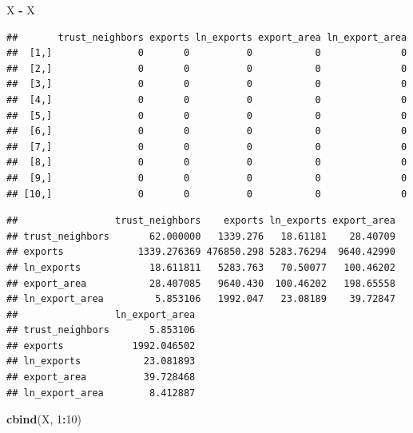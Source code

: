 \documentclass[]{book}
\newenvironment{Shaded}{\begin{snugshade}}{\end{snugshade}}
\newcommand{\KeywordTok}[1]{\textcolor[rgb]{0.13,0.29,0.53}{\textbf{#1}}}
\newcommand{\DecValTok}[1]{\textcolor[rgb]{0.00,0.00,0.81}{#1}}
\newcommand{\StringTok}[1]{\textcolor[rgb]{0.31,0.60,0.02}{#1}}
\newcommand{\OperatorTok}[1]{\textcolor[rgb]{0.81,0.36,0.00}{\textbf{#1}}}
\newcommand{\NormalTok}[1]{#1}
\theoremstyle{definition}
\theoremstyle{definition}
\theoremstyle{definition}
\theoremstyle{remark}
\begin{document}
\begin{Shaded}
\begin{Highlighting}[]
\NormalTok{X }\OperatorTok{-}\StringTok{ }\NormalTok{X}
\end{Highlighting}
\end{Shaded}

\begin{verbatim}
##       trust_neighbors exports ln_exports export_area ln_export_area
##  [1,]               0       0          0           0              0
##  [2,]               0       0          0           0              0
##  [3,]               0       0          0           0              0
##  [4,]               0       0          0           0              0
##  [5,]               0       0          0           0              0
##  [6,]               0       0          0           0              0
##  [7,]               0       0          0           0              0
##  [8,]               0       0          0           0              0
##  [9,]               0       0          0           0              0
## [10,]               0       0          0           0              0
\end{verbatim}

\begin{Shaded}
\end{Shaded}

\begin{verbatim}
##                 trust_neighbors    exports ln_exports export_area
## trust_neighbors       62.000000   1339.276   18.61181    28.40709
## exports             1339.276369 476850.298 5283.76294  9640.42990
## ln_exports            18.611811   5283.763   70.50077   100.46202
## export_area           28.407085   9640.430  100.46202   198.65558
## ln_export_area         5.853106   1992.047   23.08189    39.72847
##                 ln_export_area
## trust_neighbors       5.853106
## exports            1992.046502
## ln_exports           23.081893
## export_area          39.728468
## ln_export_area        8.412887
\end{verbatim}

\begin{Shaded}
\begin{Highlighting}[]
\KeywordTok{cbind}\NormalTok{(X, }\DecValTok{1}\OperatorTok{:}\DecValTok{10}\NormalTok{)}
\end{Highlighting}
\end{Shaded}
\end{document}
